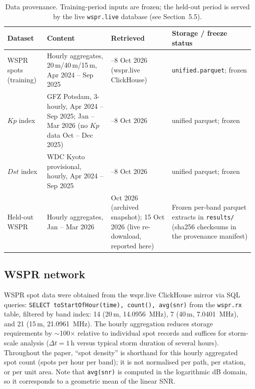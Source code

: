 \documentclass{agujournal2019}
\begin{document}
\begin{table}[h]
	\centering
	\small
	\setlength{\tabcolsep}{4pt}
	\caption{Data provenance. Training-period inputs are frozen;
		the held-out period is served by the live \texttt{wspr.live}
		database (see Section~5.5).}
	\label{tab:provenance}
	\begin{tabularx}{\textwidth}{@{}l >{\raggedright\arraybackslash}X >{\raggedright\arraybackslash}X >{\raggedright\arraybackslash}X@{}}
		\toprule
		Dataset & Content & Retrieved & Storage / freeze status \\
		\midrule
		WSPR spots (training) & Hourly aggregates, 20\,m/40\,m/15\,m,
		Apr 2024 -- Sep 2025 & 7--8 Oct 2026 (wspr.live ClickHouse) &
		\texttt{unified.parquet}; frozen \\
		$Kp$ index & GFZ Potsdam, 3-hourly,
		Apr 2024 -- Sep 2025; Jan -- Mar 2026 (no $Kp$ data Oct -- Dec 2025) &
		7--8 Oct 2026 & unified parquet; frozen \\
		$Dst$ index & WDC Kyoto provisional, hourly,
		Apr 2024 -- Sep 2025 & 7--8 Oct 2026 & unified parquet; frozen \\
		Held-out WSPR & Hourly aggregates, Jan -- Mar 2026 &
		8 Oct 2026 (archived snapshot); 15 Oct 2026 (live
		re-download, reported here) & Frozen per-band parquet extracts in
		\texttt{results/} (sha256 checksums in the provenance manifest) \\
		\bottomrule
	\end{tabularx}
\end{table}

\subsection{WSPR network}

{\sloppy
WSPR spot data were obtained from the wspr.live ClickHouse mirror via SQL
queries: \texttt{SELECT toStartOfHour(time), count(), avg(snr)} from the
\texttt{wspr.rx} table, filtered by band index: 14 (20\,m,
\SI{14.0956}{MHz}), 7 (40\,m, \SI{7.0401}{MHz}), and 21 (15\,m,
\SI{21.0961}{MHz}). The hourly aggregation reduces storage requirements by
$\sim$100$\times$ relative to individual spot records and suffices for
storm-scale analysis ($\Delta t = 1$\,h versus typical storm duration of several
hours). Throughout the paper, ``spot density'' is shorthand for this hourly
aggregated spot count (spots per hour per band); it is not normalised per
path, per station, or per unit area. Note that \texttt{avg(snr)} is computed
in the logarithmic dB domain, so it corresponds to a geometric mean of the
linear SNR.
\par}
\end{document}
